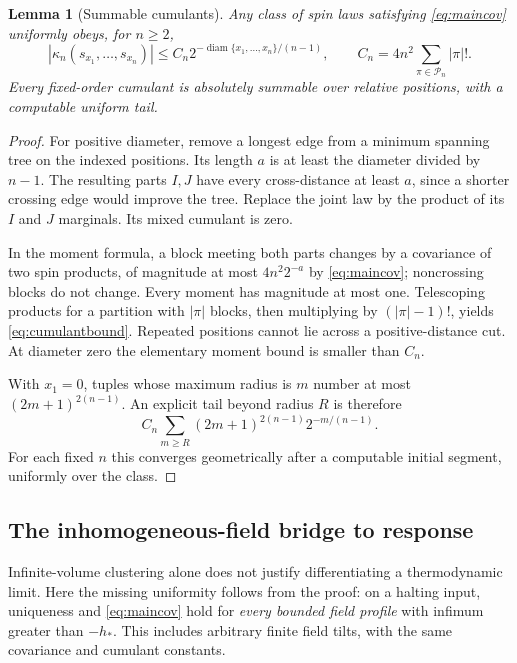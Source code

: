 \documentclass[11pt,reqno]{amsart}
\numberwithin{equation}{section}
\newtheorem{lemma}[theorem]{Lemma}
\theoremstyle{definition}
\theoremstyle{remark}
\newcommand{\diam}{\operatorname{diam}}
\begin{document}
\begin{lemma}[Summable cumulants]\label{lem:cumulant}
Any class of spin laws satisfying \eqref{eq:maincov} uniformly obeys, for $n\geq2$,
\begin{equation}\label{eq:cumulantbound}
 |\kappa_n(s_{x_1},\ldots,s_{x_n})|
 \leq C_n2^{-\diam\{x_1,\ldots,x_n\}/(n-1)},\qquad
 C_n=4n^2\sum_{\pi\in\mathcal P_n}|\pi|!.
\end{equation}
Every fixed-order cumulant is absolutely summable over relative positions, with a computable uniform tail.
\end{lemma}
\begin{proof}
For positive diameter, remove a longest edge from a minimum spanning tree on the indexed positions. Its length $a$ is at least the diameter divided by $n-1$. The resulting parts $I,J$ have every cross-distance at least $a$, since a shorter crossing edge would improve the tree. Replace the joint law by the product of its $I$ and $J$ marginals. Its mixed cumulant is zero.

In the moment formula, a block meeting both parts changes by a covariance of two spin products, of magnitude at most $4n^2 2^{-a}$ by \eqref{eq:maincov}; noncrossing blocks do not change. Every moment has magnitude at most one. Telescoping products for a partition with $|\pi|$ blocks, then multiplying by $(|\pi|-1)!$, yields \eqref{eq:cumulantbound}. Repeated positions cannot lie across a positive-distance cut. At diameter zero the elementary moment bound is smaller than $C_n$.

With $x_1=0$, tuples whose maximum radius is $m$ number at most $(2m+1)^{2(n-1)}$. An explicit tail beyond radius $R$ is therefore
\begin{equation}\label{eq:cumulanttail}
 C_n\sum_{m\geq R}(2m+1)^{2(n-1)}2^{-m/(n-1)}.
\end{equation}
For each fixed $n$ this converges geometrically after a computable initial segment, uniformly over the class.
\end{proof}

\subsection{The inhomogeneous-field bridge to response}\label{sec:response}
Infinite-volume clustering alone does not justify differentiating a thermodynamic limit. Here the missing uniformity follows from the proof: on a halting input, uniqueness and \eqref{eq:maincov} hold for \emph{every bounded field profile} with infimum greater than $-h_*$. This includes arbitrary finite field tilts, with the same covariance and cumulant constants.
\end{document}
